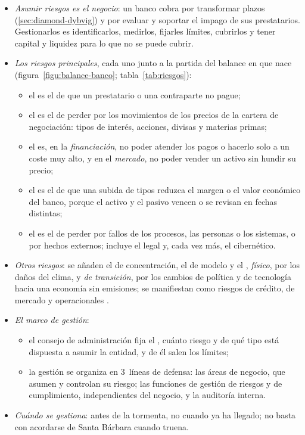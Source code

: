 \documentclass[11pt]{article}
\begin{document}
\begin{itemize}
\item \emph{Asumir riesgos es el negocio}: un banco cobra por transformar plazos (\ref{sec:diamond-dybvig}) y por evaluar y soportar el impago de sus prestatarios. Gestionarlos es identificarlos, medirlos, fijarles límites, cubrirlos y tener capital y liquidez para lo que no se puede cubrir\nocite{Hull2023Risk}.
\item \emph{Los riesgos principales}, cada uno junto a la partida del balance en que nace (figura~\ref{figu:balance-banco}; tabla~\ref{tab:riesgos}):
  \begin{itemize}
  \item el  es el de que un prestatario o una contraparte no pague;
  \item el  es el de perder por los movimientos de los precios de la cartera de negociación: tipos de interés, acciones, divisas y materias primas;
  \item el  es, en la \emph{financiación}, no poder atender los pagos o hacerlo solo a un coste muy alto, y en el \emph{mercado}, no poder vender un activo sin hundir su precio;
  \item el  es el de que una subida de tipos reduzca el margen o el valor económico del banco, porque el activo y el pasivo vencen o se revisan en fechas distintas;
  \item el  es el de perder por fallos de los procesos, las personas o los sistemas, o por hechos externos; incluye el legal y, cada vez más, el cibernético\nocite{BCBS2017Basel3}.
  \end{itemize}
\item \emph{Otros riesgos}: se añaden el de concentración, el de modelo y el , \emph{físico}, por los daños del clima, y \emph{de transición}, por los cambios de política y de tecnología hacia una economía sin emisiones; se manifiestan como riesgos de crédito, de mercado y operacionales\nocite{BCE2020Climatico} .
\item \emph{El marco de gestión}:
  \begin{itemize}
  \item el consejo de administración fija el , cuánto riesgo y de qué tipo está dispuesta a asumir la entidad, y de él salen los límites\nocite{FSB2013Apetito};
  \item la gestión se organiza en 3~líneas de defensa: las áreas de negocio, que asumen y controlan su riesgo; las funciones de gestión de riesgos y de cumplimiento, independientes del negocio, y la auditoría interna\nocite{BCBS2015Gobierno}.
  \end{itemize}
\item \emph{Cuándo se gestiona}: antes de la tormenta, no cuando ya ha llegado; no basta con acordarse de Santa Bárbara cuando truena.
\end{itemize}
\end{document}
